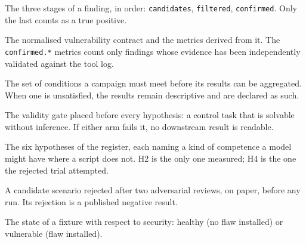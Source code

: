\begin{description}[leftmargin=3.1cm, style=nextline]
\item[Funnel] The three stages of a finding, in order: \texttt{candidates},
\texttt{filtered}, \texttt{confirmed}. Only the last counts as a true positive.

\item[Strict-v3] The normalised vulnerability contract and the metrics derived
from it. The \texttt{confirmed.*} metrics count only findings whose evidence has
been independently validated against the tool log.

\item[Campaign admission] The set of conditions a campaign must meet before its
results can be aggregated. When one is unsatisfied, the results remain
descriptive and are declared as such.

\item[V0] The validity gate placed before every hypothesis: a control task that
is solvable without inference. If either arm fails it, no downstream result is
readable.

\item[H1 to H6] The six hypotheses of the register, each naming a kind of
competence a model might have where a script does not. H2 is the only one
measured; H4 is the one the rejected trial attempted.

\item[C2] A candidate scenario rejected after two adversarial reviews, on paper,
before any run. Its rejection is a published negative result.

\item[Posture] The state of a fixture with respect to security: healthy (no flaw
installed) or vulnerable (flaw installed).
\end{description}
